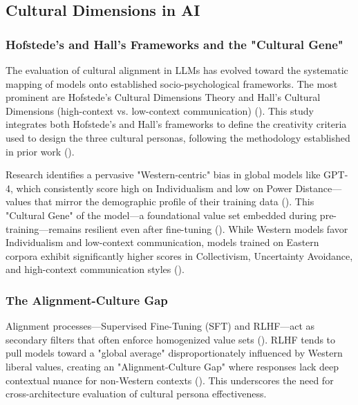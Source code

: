 \documentclass{article}
\begin{document}
\subsection{Cultural Dimensions in AI}

\subsubsection{Hofstede's and Hall's Frameworks and the "Cultural Gene"}

The evaluation of cultural alignment in LLMs has evolved toward the systematic mapping of models onto established socio-psychological frameworks. The most prominent are Hofstede's Cultural Dimensions Theory and Hall's Cultural Dimensions (high-context vs. low-context communication) (\cite{kharchenkoHowWellLLMs2024, reem_i__masoud_f9cde5f1}). This study integrates both Hofstede's and Hall's frameworks to define the creativity criteria used to design the three cultural personas, following the methodology established in prior work (\cite{haririLLMCreativityMeasuringExplaining2025}).

Research identifies a pervasive "Western-centric" bias in global models like GPT-4, which consistently score high on Individualism and low on Power Distance—values that mirror the demographic profile of their training data (\cite{emanuel_z__fenech_borg_a4a3e300, nicholas_sukiennik_6b60add4}). This "Cultural Gene" of the model—a foundational value set embedded during pre-training—remains resilient even after fine-tuning (\cite{emanuel_z__fenech_borg_a4a3e300}). While Western models favor Individualism and low-context communication, models trained on Eastern corpora exhibit significantly higher scores in Collectivism, Uncertainty Avoidance, and high-context communication styles (\cite{minsang_kim_43ca3c83}).

\subsubsection{The Alignment-Culture Gap}

Alignment processes—Supervised Fine-Tuning (SFT) and RLHF—act as secondary filters that often enforce homogenized value sets (\cite{minsang_kim_43ca3c83}). RLHF tends to pull models toward a "global average" disproportionately influenced by Western liberal values, creating an "Alignment-Culture Gap" where responses lack deep contextual nuance for non-Western contexts (\cite{nicholas_sukiennik_6b60add4}). This underscores the need for cross-architecture evaluation of cultural persona effectiveness.
\end{document}
